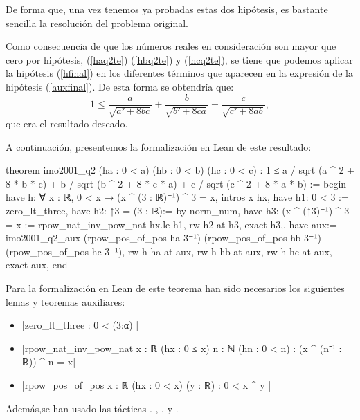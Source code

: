 \begin{demostracion}
  De forma que, una vez tenemos ya probadas estas dos hipótesis, es bastante
  sencilla la resolución del problema original.

  Como consecuencia de que los números reales en consideración son mayor que
  cero por hipótesis, (\ref{haq2te}) (\ref{hbq2te}) y (\ref{hcq2te}), se
  tiene que podemos aplicar la hipótesis (\ref{hfinal}) en los diferentes
  términos que aparecen en la expresión de la hipótesis (\ref{auxfinal}).
  De esta forma se obtendría que:
  \begin{equation}
    1≤\frac{a}{\sqrt{a²+8bc}}+\frac{b}{\sqrt{b²+8ca}}+
    \frac{c}{\sqrt{c²+8ab}},
  \end{equation}
  que era el resultado deseado.
\end{demostracion}

A continuación, presentemos la formalización en Lean de este resultado:

\begin{leancode}
theorem imo2001_q2 (ha : 0 < a) (hb : 0 < b) (hc : 0 < c) :
  1 ≤ a / sqrt (a ^ 2 + 8 * b * c) +
      b / sqrt (b ^ 2 + 8 * c * a) +
      c / sqrt (c ^ 2 + 8 * a * b) :=
begin
  have h: ∀ {x : ℝ}, 0 < x → (x ^ (3 : ℝ)⁻¹) ^ 3 = x,
  {intros x hx,
  have h1: 0 < 3 := zero_lt_three, 
  have h2: ↑3 = (3 : ℝ):= by norm_num,
  have h3: (x ^ (↑3)⁻¹) ^ 3 = x := rpow_nat_inv_pow_nat hx.le h1,
  rw h2 at h3,
  exact h3,},
  have aux:= imo2001_q2_aux (rpow_pos_of_pos ha 3⁻¹) 
  (rpow_pos_of_pos hb 3⁻¹) (rpow_pos_of_pos hc 3⁻¹),
  rw h ha at aux,
  rw h hb at aux,
  rw h hc at aux,
  exact aux,
end
\end{leancode}

Para la formalización en Lean de este teorema han sido necesarios los
siguientes lemas y teoremas auxiliares:
\begin{itemize}
\item {}|zero_lt_three : 0 < (3:α) |
\item {}|rpow_nat_inv_pow_nat {x : ℝ} (hx : 0 ≤ x) {n : ℕ} (hn : 0 < n) :
  (x ^ (n⁻¹ : ℝ)) ^ n = x|
\item {}|rpow_pos_of_pos {x : ℝ} (hx : 0 < x) (y : ℝ) : 0 < x ^ y |
\end{itemize}

Además,se han usado las tácticas
.
,
,
 y
.
